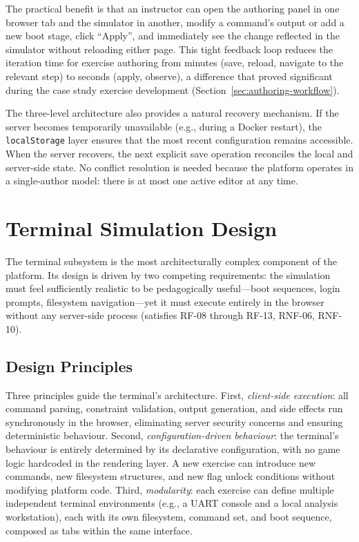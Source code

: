 The practical benefit is that an instructor can open the authoring panel in one browser tab and the simulator in another, modify a command's output or add a new boot stage, click ``Apply'', and immediately see the change reflected in the simulator without reloading either page. This tight feedback loop reduces the iteration time for exercise authoring from minutes (save, reload, navigate to the relevant step) to seconds (apply, observe), a difference that proved significant during the case study exercise development (Section~\ref{sec:authoring-workflow}).

The three-level architecture also provides a natural recovery mechanism. If the server becomes temporarily unavailable (e.g., during a Docker restart), the \texttt{localStorage} layer ensures that the most recent configuration remains accessible. When the server recovers, the next explicit save operation reconciles the local and server-side state. No conflict resolution is needed because the platform operates in a single-author model: there is at most one active editor at any time.

\section{Terminal Simulation Design}\label{sec:terminal-design}

The terminal subsystem is the most architecturally complex component of the platform. Its design is driven by two competing requirements: the simulation must feel sufficiently realistic to be pedagogically useful---boot sequences, login prompts, filesystem navigation---yet it must execute entirely in the browser without any server-side process (satisfies RF-08 through RF-13, RNF-06, RNF-10).

\subsection{Design Principles}\label{subsec:terminal-principles}

Three principles guide the terminal's architecture. First, \emph{client-side execution}: all command parsing, constraint validation, output generation, and side effects run synchronously in the browser, eliminating server security concerns and ensuring deterministic behaviour. Second, \emph{configuration-driven behaviour}: the terminal's behaviour is entirely determined by its declarative configuration, with no game logic hardcoded in the rendering layer. A new exercise can introduce new commands, new filesystem structures, and new flag unlock conditions without modifying platform code. Third, \emph{modularity}: each exercise can define multiple independent terminal environments (e.g., a UART console and a local analysis workstation), each with its own filesystem, command set, and boot sequence, composed as tabs within the same interface.

